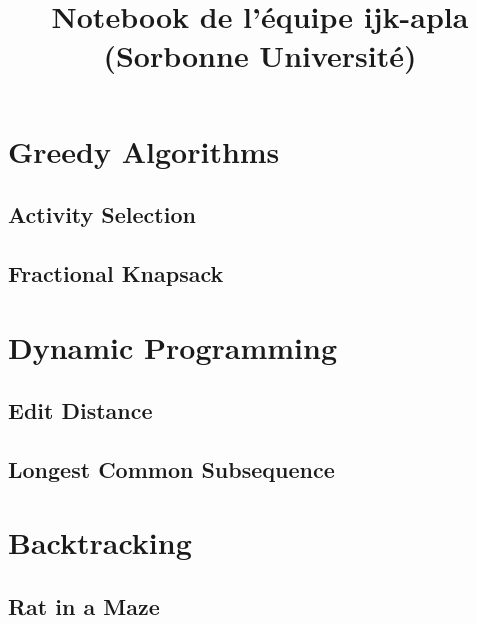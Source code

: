 \documentclass[10pt,a4paper]{article}
\title{\vspace{-4ex}\Large{Notebook de l'équipe \textbf{ijk-apla} (Sorbonne Université)}}
\author{}
\date{}
\begin{document}
\begin{landscape}
\begin{multicols}{2}

\maketitle
\tableofcontents

\section{Greedy Algorithms}

\subsection{Activity Selection}



\subsection{Fractional Knapsack}



\section{Dynamic Programming}

\subsection{Edit Distance}



\subsection{Longest Common Subsequence}



\section{Backtracking}

\subsection{Rat in a Maze}


\end{multicols}
\end{landscape}
\end{document}
